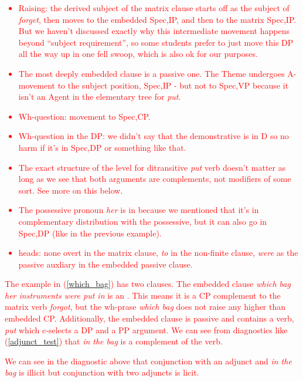 \documentclass{article}
\begin{document}
\textcolor{red}{
    \begin{itemize}
        \item Raising: the derived subject of the matrix clause starts off as the subject of \emph{forget}, then moves to the embedded Spec,IP, and then to the matrix Spec,IP.  But we haven't discussed exactly why this intermediate movement happens beyond ``subject requirement'', so some students prefer to just move this DP all the way up in one fell swoop, which is also ok for our purposes.
        \item The most deeply embedded clause is a passive one. The Theme undergoes A-movement to the subject position, Spec,IP - but not to Spec,VP because it isn't an Agent in the elementary tree for \emph{put}.
        \item Wh-question: movement to Spec,CP.
        \item Wh-question in the DP: we didn't say that the demonstrative is in D so no harm if it's in Spec,DP or something like that.
        \item The exact structure of the  level for ditransitive \emph{put} verb doesn't matter as long as we see that both arguments are complements, not modifiers of some sort. See more on this below.
        \item The possessive pronoun \emph{her} is in  because we mentioned that it's in complementary distribution with the possessive, but it can also go in Spec,DP (like in the previous example).
        \item {} heads: none overt in the matrix clause, \emph{to} in the non-finite clause, \emph{were} as the passive auxliary in the embedded passive clause.
    \end{itemize}
}

\textcolor{red}{The example in (\ref{which_bag}) has two clauses.
The embedded clause \emph{which bag her instruments were put in} is an .
This means it is a CP complement to the matrix verb \emph{forgot}, but the wh-prase \emph{which bag} does not raise any higher than embedded  CP.
Additionally, the embedded clause is passive and contains a verb, \emph{put} which c-selects a DP and a PP argument.
We can see from diagnostics like (\ref{adjunct_test}) that \emph{in the bag} is a complement of the verb.
\begin{exe}
    \label{adjunct_test}
\end{exe}
We can see in the diagnostic above that conjunction with an adjunct and \emph{in the bag} is illicit but conjunction with two adjuncts is licit.}
\end{document}
